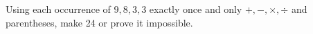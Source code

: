 Using each occurrence of $9,8,3,3$ exactly once and only $+,-,\times,\div$ and parentheses, make 24 or prove it impossible.
